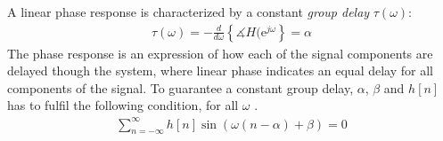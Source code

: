 A linear phase response is characterized by a constant \textit{group delay} $\tau(\omega)$:
\begin{align}
\tau(\omega)=-\frac{d}{d\omega}\left\{ \measuredangle H(\text{e}^{j\omega} \right\} = \alpha
\end{align}
The phase response is an expression of how each of the signal components are delayed though the system, where linear phase indicates an equal delay for all components of the signal. To guarantee a constant group delay, $\alpha$, $\beta$ and $h[n]$ has to fulfil the following condition, for all $\omega$ \cite{DTSP, p. 341}.
\begin{align}\label{eq:cons_gro}
\sum_{n=-\infty}^{\infty}h[n]\sin\left(\omega \left(n-\alpha \right) + \beta \right) = 0
\end{align}



